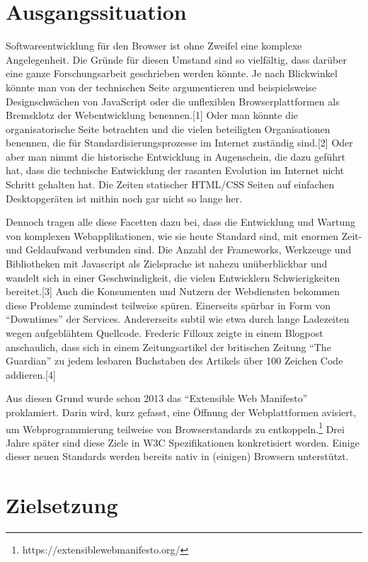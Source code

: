 \section{Ausgangssituation}\label{ausgangssituation}

Softwareentwicklung für den Browser ist ohne Zweifel eine komplexe
Angelegenheit. Die Gründe für diesen Umstand sind so vielfältig, dass
darüber eine ganze Forschungsarbeit geschrieben werden könnte. Je nach
Blickwinkel könnte man von der technischen Seite argumentieren und
beispielsweise Designschwächen von JavaScript oder die unflexiblen
Browserplattformen als Bremsklotz der Webentwicklung benennen.{[}1{]}
Oder man könnte die organisatorische Seite betrachten und die vielen
beteiligten Organisationen benennen, die für Standardisierungsprozesse
im Internet zuständig sind.{[}2{]} Oder aber man nimmt die historische
Entwicklung in Augenschein, die dazu geführt hat, dass die technische
Entwicklung der rasanten Evolution im Internet nicht Schritt gehalten
hat. Die Zeiten statischer HTML/CSS Seiten auf einfachen Desktopgeräten
ist mithin noch gar nicht so lange her.

Dennoch tragen alle diese Facetten dazu bei, dass die Entwicklung und
Wartung von komplexen Webapplikationen, wie sie heute Standard sind, mit
enormen Zeit- und Geldaufwand verbunden sind. Die Anzahl der Frameworks,
Werkzeuge und Bibliotheken mit Javascript als Zielsprache ist nahezu
unüberblickbar und wandelt sich in einer Geschwindigkeit, die vielen
Entwicklern Schwierigkeiten bereitet.{[}3{]} Auch die Konsumenten und
Nutzern der Webdiensten bekommen diese Probleme zumindest teilweise
spüren. Einerseits spürbar in Form von ``Downtimes'' der Services.
Andererseits subtil wie etwa durch lange Ladezeiten wegen aufgeblähtem
Quellcode. Frederic Filloux zeigte in einem Blogpost anschaulich, dass
sich in einem Zeitungsartikel der britischen Zeitung ``The Guardian'' zu
jedem lesbaren Buchstaben des Artikels über 100 Zeichen Code
addieren.{[}4{]}

Aus diesen Grund wurde schon 2013 das ``Extensible Web Manifesto''
proklamiert. Darin wird, kurz gefasst, eine Öffnung der Webplattformen
avisiert, um Webprogrammierung teilweise von Browserstandards zu
entkoppeln.\footnote{https://extensiblewebmanifesto.org/} Drei Jahre
später sind diese Ziele in W3C Spezifikationen konkretisiert worden.
Einige dieser neuen Standards werden bereits nativ in (einigen) Browsern
unterstützt.

\section{Zielsetzung}\label{zielsetzung}

